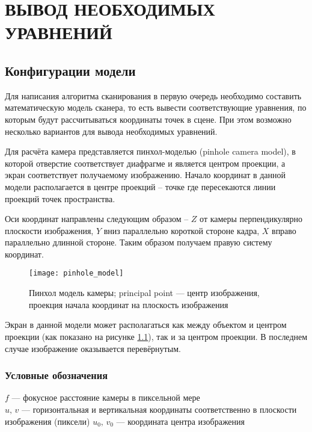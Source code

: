 \chapter{ВЫВОД НЕОБХОДИМЫХ УРАВНЕНИЙ}
    \section{Конфигурации модели}
        Для написания алгоритма сканирования в первую очередь необходимо составить математическую модель сканера, то есть вывести соответствующие уравнения, по которым будут рассчитываться координаты точек в сцене. При этом возможно несколько вариантов для вывода необходимых уравнений.
        
        Для расчёта камера представляется пинхол-моделью (pinhole camera model), в которой отверстие соответствует диафрагме и является центром проекции, а экран соответствует получаемому изображению. Начало координат в данной модели располагается в центре проекций -- точке где пересекаются линии проекций точек пространства.
        
        Оси координат направлены следующим образом -- $ Z $ от камеры перпендикулярно плоскости изображения, $ Y $ вниз параллельно короткой стороне кадра, $ X $ вправо параллельно длинной стороне. Таким образом получаем правую систему координат.
        
        \begin{figure}[H]
            \centering
            \texttt{[image: pinhole\_model]}
            \caption{Пинхол модель камеры; principal point --- центр изображения, проекция начала координат на плоскость изображения}\label{pic:pinhole_model}
        \end{figure}

        Экран в данной модели может располагаться как между объектом и центром проекции (как показано на рисунке \ref{pic:pinhole_model}), так и за центром проекции. В последнем случае изображение оказывается перевёрнутым.

        \subsection{Условные обозначения}
            $ f $ --- фокусное расстояние камеры в пиксельной мере\\
            $ u,\,v $ --- горизонтальная и вертикальная координаты соответственно в плоскости изображения (пиксели) 
            $ u_0,\,v_0 $ --- координата центра изображения
            

